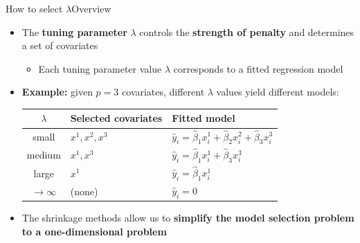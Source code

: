 \documentclass[hyperref={pdfpagelabels=false}]{beamer}
\begin{document}




















\begin{frame}{How to select $\lambda$}{Overview}
    \begin{itemize}
        \item The \textbf{tuning parameter} $\lambda$ controls the 
        \textbf{strength of penalty} and determines a set of covariates
        \vspace{0.2cm}
        \begin{itemize}
            \item Each tuning parameter value $\lambda$ corresponds to 
            a fitted regression model
            \vspace{0.2cm}
        \end{itemize}
        \item \textbf{Example:} given $p=3$ covariates, different $\lambda$ 
        values yield different models:
        \vspace{0.2cm}
        \begin{center}
        \begin{tabular}{cll}
            \hline
            $\lambda$ & Selected covariates & Fitted model \\
            \hline
            small & $x^1, x^2, x^3$ & $\hat{y}_i = \hat{\beta}_1 x^1_i + \hat{\beta}_2 x^2_i + \hat{\beta}_3 x^3_i$ \\
            medium & $x^1, x^3$ & $\hat{y}_i = \hat{\beta}_1 x^1_i + \hat{\beta}_3 x^3_i$ \\
            large & $x^1$ & $\hat{y}_i = \hat{\beta}_1 x^1_i$ \\
            $\to \infty$ & (none) & $\hat{y}_i = 0$ \\
            \hline
        \end{tabular}
        \end{center}
        \vspace{0.2cm}
        \item The shrinkage methods allow us to \textbf{simplify the model 
        selection problem to a one-dimensional problem}
    \end{itemize}
\end{frame}
\end{document}
